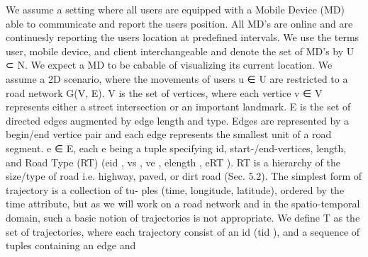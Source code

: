 We assume a setting where all users are equipped
with a Mobile Device (MD) able to communicate and
report the users position. All MD’s are online and are
continuesly reporting the users location at predeﬁned
intervals. We use the terms user, mobile device, and
client interchangeable and denote the set of MD’s by
U ⊂ N. We expect a MD to be cabable of visualizing
its current location.
We assume a 2D scenario, where the movements of
users u ∈ U are restricted to a road network G(V, E).
V is the set of vertices, where each vertice v ∈ V
represents either a street intersection or an important
landmark. E is the set of directed edges augmented
by edge length and type. Edges are represented by
a begin/end vertice pair and each edge represents the
smallest unit of a road segment. e ∈ E, each e being
a tuple specifying id, start-/end-vertices, length, and
Road Type (RT) (eid , vs , ve , elength , eRT ). RT is a
hierarchy of the size/type of road i.e. highway, paved,
or dirt road (Sec. 5.2).
The simplest form of trajectory is a collection of tu-
ples (time, longitude, latitude), ordered by the time
attribute, but as we will work on a road network and
in the spatio-temporal domain, such a basic notion of
trajectories is not appropriate. We deﬁne T as the set
of trajectories, where each trajectory consist of an id
(tid ), and a sequence of tuples containing an edge and




